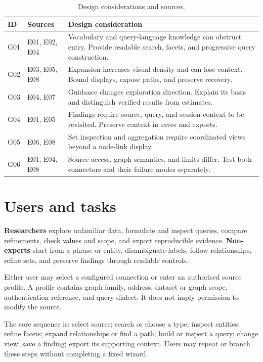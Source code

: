 \documentclass[11pt,a4paper]{article}
\begin{document}
\begin{table}[htbp]\centering\small
\caption{Design considerations and sources.}\label{tab:gaps}
\begin{tabularx}{\textwidth}{@{}P{1cm}P{2.1cm}X@{}}
\toprule ID & Sources & Design consideration\\\midrule
G01 & E01, E02, E04 & Vocabulary and query-language knowledge can obstruct entry. Provide readable search, facets, and progressive query construction.\\
G02 & E03, E05, E08 & Expansion increases visual density and can lose context. Bound displays, expose paths, and preserve recovery.\\
G03 & E04, E07 & Guidance changes exploration direction. Explain its basis and distinguish verified results from estimates.\\
G04 & E01, E05 & Findings require source, query, and session context to be revisited. Preserve context in saves and exports.\\
G05 & E06, E08 & Set inspection and aggregation require coordinated views beyond a node-link display.\\
G06 & E01, E04, E08 & Source access, graph semantics, and limits differ. Test both connectors and their failure modes separately.\\
\bottomrule\end{tabularx}\end{table}

\section{Users and tasks}
\textbf{Researchers} explore unfamiliar data, formulate and inspect queries, compare refinements, check values and scope, and export reproducible evidence. \textbf{Non-experts} start from a phrase or entity, disambiguate labels, follow relationships, refine sets, and preserve findings through readable controls.

Either user may select a configured connection or enter an authorised source profile. A profile contains graph family, address, dataset or graph scope, authentication reference, and query dialect. It does not imply permission to modify the source.

The core sequence is: select source; search or choose a type; inspect entities; refine facets; expand relationships or find a path; build or inspect a query; change view; save a finding; export its supporting context. Users may repeat or branch these steps without completing a fixed wizard.
\end{document}
